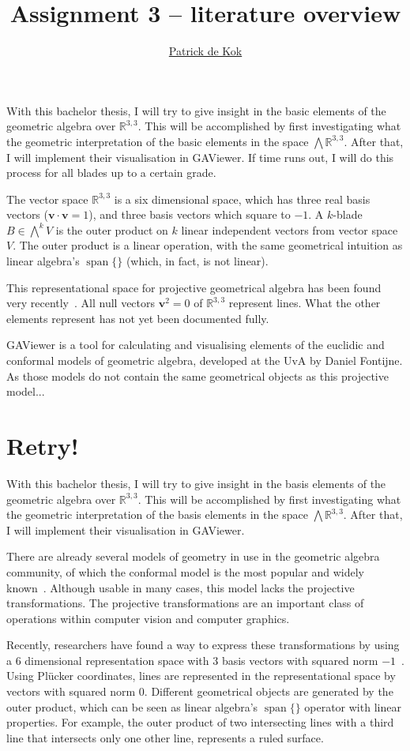 \documentclass[a4paper,11pt,twoside]{article}
\title{Assignment 3 -- literature overview}
\author{\href{mailto:pkok@science.uva.nl}{Patrick de Kok}}
\newcommand{\V}[1]{\ensuremath{\mathbf{#1}}}
\newcommand{\RL}{\ensuremath{\mathbb{R}^{3,3}}}
\begin{document}
\maketitle
With this bachelor thesis, I will try to give insight in the basic elements of the geometric algebra over $\RL$.  This will be accomplished by first investigating what the geometric interpretation of the basic elements in the space $\bigwedge \RL$.  After that, I will implement their visualisation in GAViewer.  If time runs out, I will do this process for all blades up to a certain grade.

The vector space $\RL$ is a six dimensional space, which has three real basis vectors ($\V{v} \cdot \V{v} = 1$), and three basis vectors which square to $-1$.  A $k$-blade $B \in \bigwedge^k V$ is the outer product on $k$ linear independent vectors from vector space $V$.  The outer product is a linear operation, with the same geometrical intuition as linear algebra's $\operatorname{span}\{\}$ (which, in fact, is not linear).

This representational space for projective geometrical algebra has been found very recently~\cite{Hongbo}.  All null vectors $\V{v}^2 = 0$ of $\RL$ represent lines.  What the other elements represent has not yet been documented fully.  

GAViewer is a tool for calculating and visualising elements of the euclidic and conformal models of geometric algebra, developed at the UvA by Daniel Fontijne.  As those models do not contain the same geometrical objects as this projective model...

\section{Retry!}
With this bachelor thesis, I will try to give insight in the basis elements of the geometric algebra over $\RL$.  This will be accomplished by first investigating what the geometric interpretation of the basis elements in the space $\bigwedge \RL$.  After that, I will implement their visualisation in GAViewer.  

There are already several models of geometry in use in the geometric algebra community, of which the conformal model is the most popular and widely known~\cite{TheBook}.  Although usable in many cases, this model lacks the projective transformations.  The projective transformations are an important class of operations within computer vision and computer graphics.

Recently, researchers have found a way to express these transformations by using a 6 dimensional representation space with 3 basis vectors with squared norm $-1$~\cite{Hongbo}.  Using Pl\"ucker coordinates, lines are represented in the representational space by vectors with squared norm 0.  Different geometrical objects are generated by the outer product, which can be seen as linear algebra's $\operatorname{span}\{\}$ operator with linear properties.  For example, the outer product of two intersecting lines with a third line that intersects only one other line, represents a ruled surface.
\end{document}

